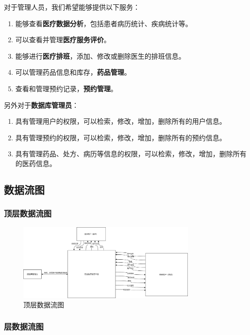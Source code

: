 \documentclass{article}
\begin{document}
\vspace{0.5cm}
对于管理人员，我们希望能够提供以下服务：
\begin{enumerate}[itemsep=0.01em]
    \item 能够查看\textbf{医疗数据分析}，包括患者病历统计、疾病统计等。
    \item 可以查看并管理\textbf{医疗服务评价}。
    \item 能够进行\textbf{医疗排班}，添加、修改或删除医生的排班信息。
    \item 可以管理药品信息和库存，\textbf{药品管理}。
    \item 查看和管理预约记录，\textbf{预约管理}。
\end{enumerate}

\vspace{0.5cm}
另外对于\textbf{数据库管理员}：
\begin{enumerate}[itemsep=0.01em]
    \item 具有管理用户的权限，可以检索，修改，增加，删除所有的用户信息。
    \item 具有管理预约的权限，可以检索，修改，增加，删除所有的预约信息。
    \item 具有管理药品、处方、病历等信息的权限，可以检索，修改，增加，删除所有的医药信息。
\end{enumerate}

\subsection{数据流图}

\subsubsection{顶层数据流图}

\begin{figure}[H]
    \centering
    \includegraphics[width=0.8\textwidth]{images/all_dataflow.png}
    \caption{顶层数据流图}
\end{figure}

\subsubsection{层数据流图}
\end{document}
